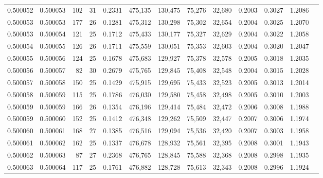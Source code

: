 \begin{tabular}{rrrrrrrrrrrrr}
0.500052 & 0.500053 & 102 &  31 &                                     0.2331 & 475,135 & 130,475 &  75,276 &  32,680 & 0.2003 & 0.3027 & 1.2086 \\
0.500053 & 0.500053 & 177 &  26 &                                     0.1281 & 475,312 & 130,298 &  75,302 &  32,654 & 0.2004 & 0.3025 & 1.2070 \\
0.500053 & 0.500054 & 121 &  25 &                                     0.1712 & 475,433 & 130,177 &  75,327 &  32,629 & 0.2004 & 0.3022 & 1.2058 \\
0.500054 & 0.500055 & 126 &  26 &                                     0.1711 & 475,559 & 130,051 &  75,353 &  32,603 & 0.2004 & 0.3020 & 1.2047 \\
0.500055 & 0.500056 & 124 &  25 &                                     0.1678 & 475,683 & 129,927 &  75,378 &  32,578 & 0.2005 & 0.3018 & 1.2035 \\
0.500056 & 0.500057 &  82 &  30 &                                     0.2679 & 475,765 & 129,845 &  75,408 &  32,548 & 0.2004 & 0.3015 & 1.2028 \\
0.500057 & 0.500058 & 150 &  25 &                                     0.1429 & 475,915 & 129,695 &  75,433 &  32,523 & 0.2005 & 0.3013 & 1.2014 \\
0.500058 & 0.500059 & 115 &  25 &                                     0.1786 & 476,030 & 129,580 &  75,458 &  32,498 & 0.2005 & 0.3010 & 1.2003 \\
0.500059 & 0.500059 & 166 &  26 &                                     0.1354 & 476,196 & 129,414 &  75,484 &  32,472 & 0.2006 & 0.3008 & 1.1988 \\
0.500059 & 0.500060 & 152 &  25 &                                     0.1412 & 476,348 & 129,262 &  75,509 &  32,447 & 0.2007 & 0.3006 & 1.1974 \\
0.500060 & 0.500061 & 168 &  27 &                                     0.1385 & 476,516 & 129,094 &  75,536 &  32,420 & 0.2007 & 0.3003 & 1.1958 \\
0.500061 & 0.500062 & 162 &  25 &                                     0.1337 & 476,678 & 128,932 &  75,561 &  32,395 & 0.2008 & 0.3001 & 1.1943 \\
0.500062 & 0.500063 &  87 &  27 &                                     0.2368 & 476,765 & 128,845 &  75,588 &  32,368 & 0.2008 & 0.2998 & 1.1935 \\
0.500063 & 0.500064 & 117 &  25 &                                     0.1761 & 476,882 & 128,728 &  75,613 &  32,343 & 0.2008 & 0.2996 & 1.1924 \\

\end{tabular}
